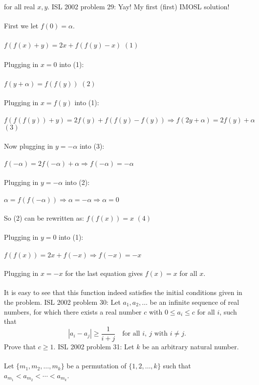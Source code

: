 for all real $x,y$. 
ISL 2002 problem 29:  Yay! My first (first) IMOSL solution! \\\\
First we let $f(0) = \alpha$. \\\\
$f(f(x)+y) = 2x + f(f(y)-x)$ $(1)$ \\\\
Plugging in $x=0$ into (1): \\\\
$f(y+\alpha) = f(f(y))$ $(2)$ \\\\
Plugging in $x=f(y)$ into (1): \\\\
$f(f(f(y))+y) = 2f(y) + f(f(y)-f(y)) \Rightarrow f(2y+\alpha) = 2f(y) + \alpha$ $(3)$ \\\\
Now plugging in $y=-\alpha$ into (3): \\\\
$f(-\alpha) = 2f(-\alpha) + \alpha \Rightarrow f(-\alpha) = -\alpha$ \\\\
Plugging in $y=-\alpha$ into (2): \\\\
$\alpha = f(f(-\alpha)) \Rightarrow \alpha = -\alpha \Rightarrow \alpha = 0$ \\\\
So (2) can be rewritten as: $f(f(x)) = x$ $(4)$ \\\\
Plugging in $y=0$ into (1): \\\\
$f(f(x)) = 2x + f(-x) \Rightarrow f(-x) = -x$ \\\\
Plugging in $x=-x$ for the last equation gives $f(x)=x$ for all $x$. \\\\
It is easy to see that this function indeed satisfies the initial conditions given in the problem. 
ISL 2002 problem 30:  Let $a_1,a_2,\ldots$ be an infinite sequence of real numbers, for which there exists a real number $c$ with $0\leq a_i\leq c$ for all $i$, such that
\[
\left\lvert a_i-a_j \right\rvert\geq \frac{1}{i+j} \quad \text{for all }i,\ j \text{ with } i \neq j.
\]
Prove that $c\geq1$. 
ISL 2002 problem 31:  Let $k$ be an arbitrary natural number. \\\\
Let $\{m_1,m_2,\ldots{},m_k\}$ be a permutation of $\{1,2,\ldots{},k\}$ such that $a_{m_1} < a_{m_2} < \cdots{} < a_{m_k}$. \\\\
